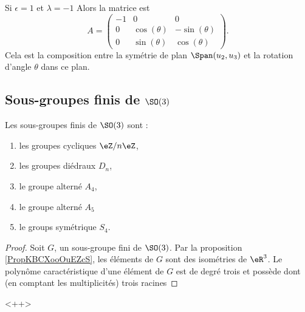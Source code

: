 \begin{subproof}
    \item[Si \( \epsilon=1\) et \( \lambda=-1\)] Alors la matrice est
        \begin{equation}
            A=\begin{pmatrix}
                -1    &   0    &   0    \\
                0    &   \cos(\theta)    &   -\sin(\theta)    \\
                0    &   \sin(\theta)    &   \cos(\theta)
            \end{pmatrix}.
        \end{equation}
        Cela est la composition entre la symétrie de plan \( \Span(u_2,u_3)\) et la rotation d'angle \( \theta\) dans ce plan.
\end{subproof}

\subsection{Sous-groupes finis de \( \SO(3)\)}

\begin{proposition}
    Les sous-groupes finis de \( \SO(3)\) sont :
    \begin{multicols}{2}
        \begin{enumerate}
            \item
                les groupes cycliques \( \eZ/n\eZ\),
            \item
                les groupes diédraux \( D_n\),
            \item
                le groupe alterné \( A_4\),
            \item
                le groupe alterné \( A_5\)
            \item
                le groups symétrique \( S_4\).
        \end{enumerate}
    \end{multicols}
\end{proposition}

\begin{proof}
    Soit \( G\), un sous-groupe fini de \( \SO(3)\). Par la proposition \ref{PropKBCXooOuEZcS}, les éléments de \( G\) sont des isométries de \( \eR^3\). Le polynôme caractéristique d'une élément de \( G\) est de degré trois et possède dont (en comptant les multiplicités) trois racines
\end{proof}
<++>

